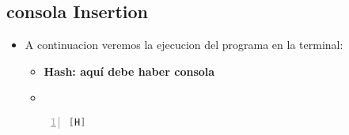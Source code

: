 \subsection{consola Insertion}
\begin{itemize}
  \item A continuacion veremos la ejecucion del programa en la terminal:
  \begin{itemize}
    \item \textbf{Hash: aquí debe haber consola}
    \item
  \end{itemize}
  \begin{lstlisting}[language=Java, caption={TITULOOOOOO}, numbers=left, firstnumber=1][H]
  \end{lstlisting}
\end{itemize}




\begin{comment}
  \begin{itemize}
    \item \textbf{Hash: aquí debe haber consola}
    \item
  \end{itemize}
  \begin{lstlisting}[language=Java, caption={TITULOOOOOO}, numbers=left, firstnumber=1][H]
  \end{lstlisting}
\end{comment}

